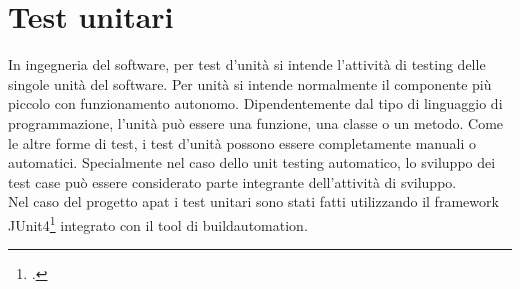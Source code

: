 \section{Test unitari}\label{sec:test-unitari}
In ingegneria del software, per test d'unità si intende l'attività di testing delle
singole unità del software.
Per unità si intende normalmente il componente più piccolo con funzionamento autonomo.
Dipendentemente dal tipo di linguaggio di programmazione, l'unità può essere una funzione, una classe o un metodo.
Come le altre forme di test, i test d'unità possono essere completamente manuali o automatici.
Specialmente nel caso dello unit testing automatico, lo sviluppo dei test case può essere considerato parte integrante dell'attività di sviluppo.\\
Nel caso del progetto \gls{apat} i test unitari sono stati fatti utilizzando il framework JUnit4\footcite{site:junit4} integrato con il tool di \gls{buildautomation}.

\setcounter{rowcount}{0}

\setcounter{testCounter}{0}

